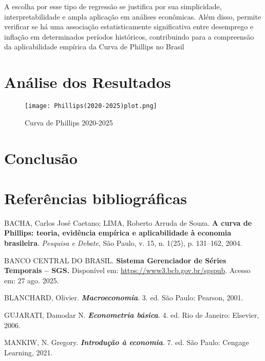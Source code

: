 \documentclass[12pt,oneside]{abntex2}
\begin{document}
A escolha por esse tipo de regressão se justifica por sua simplicidade, interpretabilidade e ampla aplicação em análises econômicas. Além disso, permite verificar se há uma associação estatisticamente significativa entre desemprego e inflação em determinados períodos históricos, contribuindo para a compreensão da aplicabilidade empírica da Curva de Phillips no Brasil

\section{\textbf{Análise dos Resultados}}





\begin{figure}[htbp]
    \centering
    \texttt{[image: Phillips(2020-2025)plot.png]}
    \caption{Curva de Phillips 2020-2025}
    \label{fig:minha-imagem}
\end{figure}

\section{\textbf{Conclusão}}

\section{\textbf{Referências bibliográficas}}
\setlength{\parindent}{0pt} %
\setlength{\itemindent}{0pt} %
\setlength{\leftskip}{0pt}   %


BACHA, Carlos José Caetano; LIMA, Roberto Arruda de Souza. \textbf{A curva de Phillips: teoria, evidência empírica e aplicabilidade à economia brasileira}. \textit{Pesquisa e Debate}, São Paulo, v. 15, n. 1(25), p. 131–162, 2004.



BANCO CENTRAL DO BRASIL. \textbf{Sistema Gerenciador de Séries Temporais – SGS.} Disponível em: \url{https://www3.bcb.gov.br/sgspub}. Acesso em: 27 ago. 2025.



BLANCHARD, Olivier. \textbf{\textit{Macroeconomia}}. 3. ed. São Paulo: Pearson, 2001.



GUJARATI, Damodar N. \textbf{\textit{Econometria básica}}. 4. ed. Rio de Janeiro: Elsevier, 2006.



MANKIW, N. Gregory. \textbf{\textit{Introdução à economia}}. 7. ed. São Paulo: Cengage Learning, 2021.
\end{document}
